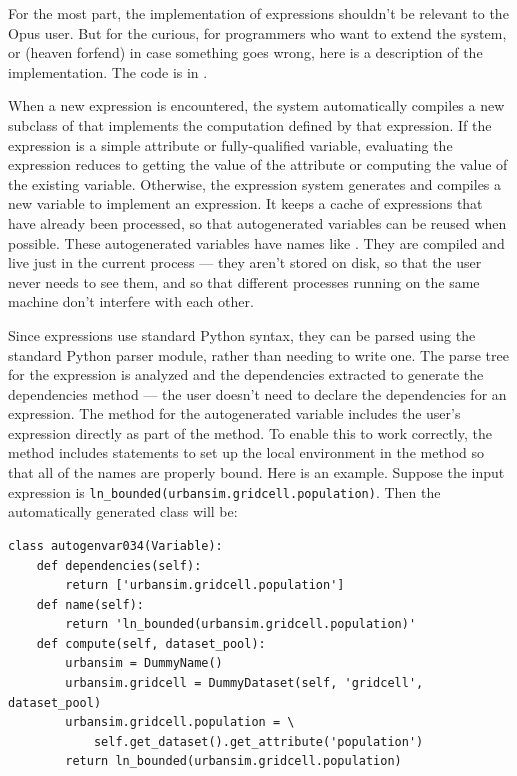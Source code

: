 {For the most part, the implementation of expressions shouldn't be relevant
to the Opus user.  But for the curious, for programmers who want to extend
the system, or (heaven forfend) in case something goes wrong, here is a
description of the implementation.  The code is in
.  

When a new expression is encountered, the system automatically compiles a
new subclass of  that implements the computation defined by
that expression.  If the expression is a simple attribute or
fully-qualified variable, evaluating the expression reduces to getting the
value of the attribute or computing the value of the existing
variable. Otherwise, the expression system generates and compiles a new
variable to implement an expression. It keeps a cache of expressions that
have already been processed, so that autogenerated variables can be reused
when possible. These autogenerated variables have names like
. They are compiled and live just in the current
process --- they aren't stored on disk, so that the user never needs to see
them, and so that different processes running on the same machine don't
interfere with each other.

Since expressions use standard Python syntax, they can be parsed using the
standard Python parser module, rather than needing to write one. The parse
tree for the expression is analyzed and the dependencies extracted to
generate the dependencies method --- the user doesn't need to declare the
dependencies for an expression. The  method for the
autogenerated variable includes the user's expression directly as part of
the method.  To enable this to work correctly, the method includes
statements to set up the local environment in the method so that all of the
names are properly bound.  Here is an example.  Suppose the input
expression is \verb|ln_bounded(urbansim.gridcell.population)|.  Then the
automatically generated class will be:
\begin{verbatim}
class autogenvar034(Variable):
    def dependencies(self):
        return ['urbansim.gridcell.population']
    def name(self):
        return 'ln_bounded(urbansim.gridcell.population)'
    def compute(self, dataset_pool):
        urbansim = DummyName()
        urbansim.gridcell = DummyDataset(self, 'gridcell', dataset_pool)
        urbansim.gridcell.population = \
            self.get_dataset().get_attribute('population')
        return ln_bounded(urbansim.gridcell.population)
\end{verbatim}

}
